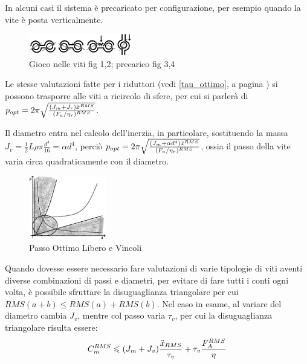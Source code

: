 In alcuni casi il sistema è precaricato per configurazione, per esempio quando la vite è posta verticalmente.

\begin{figure}[h]
    \centering
    \includegraphics[width=0.4\textwidth]{Immagini/gioco_viti_ricircolo.png}
    \caption{Gioco nelle viti fig 1,2; precarico fig 3,4}
\end{figure}

Le stesse valutazioni fatte per i riduttori (vedi \ref{tau_ottimo}, a pagina \pageref{tau_ottimo}) si possono trasporre alle viti a ricircolo di sfere, per cui si parlerà di \(p_{opt}=2\pi \sqrt{\frac{(J_m+J_r)\Ddot{x}^{RMS}}{(F_a/\eta_r)^{RMS}}}\).

Il diametro entra nel calcolo dell'inerzia, in particolare, sostituendo la massa \(J_v=\frac{1}{2}L\rho \pi \frac{d^4}{16} = \alpha d^4\), perciò \(p_{opt}=2\pi \sqrt{\frac{(J_m+\alpha d^4)\Ddot{x}^{RMS}}{(F_a/\eta_r)^{RMS}}}\), ossia il passo della vite varia circa quadraticamente con il diametro.
\begin{figure}[h]
    \centering
    \includegraphics[width=0.3\textwidth]{Immagini/passo_ottimo_libero.png}
    \caption{Passo Ottimo Libero e Vincoli}
\end{figure}

Quando dovesse essere necessario fare valutazioni di varie tipologie di viti aventi diverse combinazioni di passi e diametri, per evitare di fare tutti i conti ogni volta, è possibile sfruttare la disuguaglianza triangolare per cui \(RMS(a+b) \leqslant RMS(a) + RMS(b) \). Nel caso in esame, al variare del diametro cambia \(J_v\), mentre col passo varia \(\tau_v\), per cui la disuguaglianza triangolare risulta essere:
\[ C_m^{RMS} \leqslant (J_m + J_v) \frac{\Ddot{x}_{RMS}}{\tau_v} + \tau_v \frac{F_A^{RMS}}{\eta} \]
